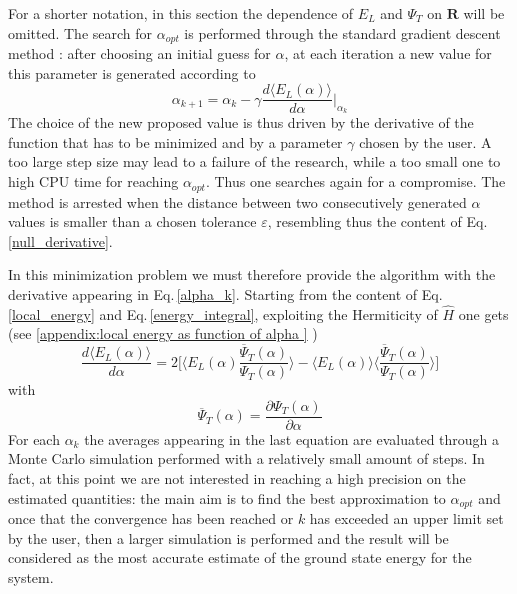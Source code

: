 For a shorter notation, in this section the dependence of $E_L$ and $\Psi_T$ on $\bm{R}$ will be omitted. The search for $\alpha_{opt}$ is performed through the standard gradient descent method \cite{painless}: after choosing an initial guess for $\alpha$, at each iteration a new value for this parameter is generated according to
\begin{equation}
    \alpha_{k+1} = \alpha_{k} - \gamma \frac{d \langle E_L(\alpha) \rangle}{d\alpha} \bigg\vert_{\alpha_k}
    \label{alpha_k}
\end{equation}
The choice of the new proposed value is thus driven by the derivative of the function that has to be minimized and by a parameter $\gamma$ chosen by the user. A too large step size may lead to a failure of the research, while a too small one to high CPU time for reaching $\alpha_{opt}$. Thus one searches again for a compromise. The method is arrested when the distance between two consecutively generated $\alpha$ values is smaller than a chosen tolerance $\varepsilon$, resembling thus the content of Eq.\,\ref{null_derivative}. 

In this minimization problem we must therefore provide the algorithm with the derivative appearing in Eq.\,\ref{alpha_k}. Starting from the content of Eq.\,\ref{local_energy} and Eq.\,\ref{energy_integral}, exploiting the Hermiticity of $\hat{H}$ one gets (see \ref{appendix:local energy as function of alpha } )
\begin{equation}
    \frac{d\langle E_L(\alpha) \rangle}{d\alpha} = 2 \bigg[ \bigg\langle E_L(\alpha) \frac{\overline{\Psi}_T(\alpha)}{\Psi_T(\alpha)} \bigg\rangle - \langle E_L(\alpha) \rangle \bigg\langle \frac{\overline{\Psi}_T(\alpha)}{\Psi_T(\alpha)}\bigg\rangle \bigg]
    \label{dEnergy_dalpha}
\end{equation}
with 
\begin{equation*}
    \overline{\Psi}_T(\alpha) = \frac{\partial  \Psi_T(\alpha)}{\partial \alpha}
\end{equation*}
For each $\alpha_k$ the averages appearing in the last equation are evaluated through a Monte Carlo simulation performed with a relatively small amount of steps. In fact, at this point we are not interested in reaching a high precision on the estimated quantities: the main aim is to find the best approximation to $\alpha_{opt}$ and once that the convergence has been reached or $k$ has exceeded an upper limit set by the user, then a larger simulation is performed and the result will be considered as the most accurate estimate of the ground state energy for the system. 

